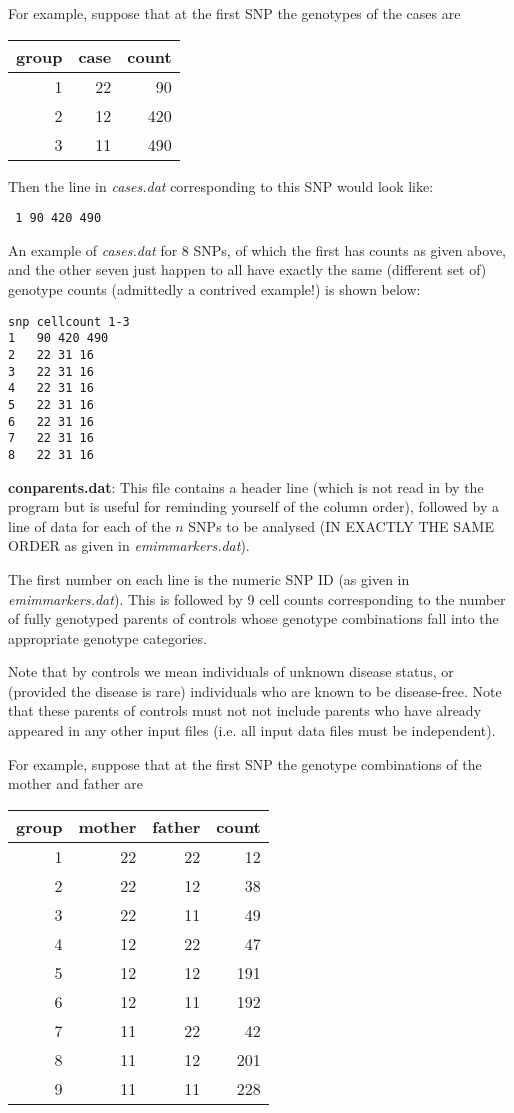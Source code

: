 \documentclass[a4paper,11pt]{report}
\begin{document}
For example, suppose that at the first SNP the genotypes of the cases are

\begin{tabular}{rrr} 
group    &   case &count \\ \hline
1     &  22   &   90\\
2     &  12   &   420\\
3     &  11   &   490\\
\end{tabular}

Then the line in	{\it  cases.dat} corresponding to this SNP 
would look like:

{\tt
1 	90 420 490
}

An example of {\it  cases.dat} for 8 SNPs, of which the first has counts as given above, and the other seven just happen to all have exactly the same (different set of) genotype counts (admittedly a contrived example!) is shown below:

\begin{verbatim}
snp	cellcount 1-3
1 	90 420 490
2 	22 31 16
3 	22 31 16
4 	22 31 16
5 	22 31 16
6 	22 31 16
7 	22 31 16
8 	22 31 16
\end{verbatim}
 
\bigskip

	{\bf  conparents.dat}: 
 This file contains a header line
(which is not read in by the program but is useful for reminding
yourself of the  column order), followed by a line of data
for each of the $n$ SNPs to be analysed (IN EXACTLY THE SAME ORDER
as given in {\it emimmarkers.dat}).

The first number on each line is the numeric SNP ID (as given in {\it emimmarkers.dat}). This is followed by 9 cell counts corresponding to the number
of fully genotyped parents of controls whose genotype combinations
 fall into the appropriate genotype categories. 

Note that by controls we mean individuals of unknown disease status, or
(provided the disease is rare) individuals who are known to
be disease-free.
Note that these
 parents of controls must not not include parents
who have already appeared in any other input files 
(i.e. all input data files must be
independent).


For example, suppose that at the first SNP the genotype combinations of the mother and father are

\begin{tabular}{rrrr} 
group    &   mother &father   &count \\ \hline
1 &22 &22 &12\\
2 &22 &12 &38\\
3 &22 &11 &49\\
4 &12 &22 &47\\
5 &12 &12       &191\\
6 &12 &11       &192\\
7 &11 &22 &42\\
8 &11 &12       &201\\
9 &11 &11       &228\\
\end{tabular}
\end{document}
